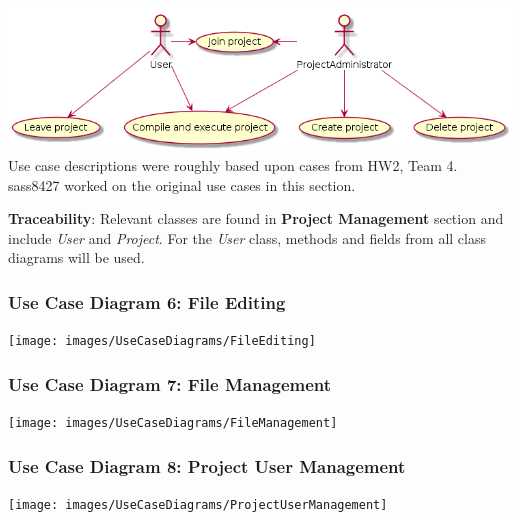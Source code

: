 \documentclass[twoside,letterpaper]{article}
\begin{document}
	\bigskip
		
		\includegraphics[width=6.0in]{images/UseCaseDiagrams/PMUCD} \vspace{5cm}
		\; \newline
		Use case descriptions were roughly based upon cases from HW2, Team 4. sass8427 worked on the original use cases in this section.\newline
	
	\noindent \textbf{Traceability}:
	Relevant classes are found in \textbf{Project Management} section and include \textit{User} and \textit{Project}. For the \textit{User} class, methods and fields from all class diagrams will be used.
	
	\newpage
	
	\subsubsection[Use Case Diagram 6: File Editing]{\rmfamily\bfseries\color{black}
		Use Case Diagram 6: File Editing}
	
	\texttt{[image: images/UseCaseDiagrams/FileEditing]}
	
	\newpage
	
	\subsubsection[Use Case Diagram 7: File Management]{\rmfamily\bfseries\color{black}
		Use Case Diagram 7: File Management}
	\hypertarget{RefHeading22059017292}{}
	
	\texttt{[image: images/UseCaseDiagrams/FileManagement]}
	
	\newpage
	
	\subsubsection[Use Case Diagram 8: Project User Management]{\rmfamily\bfseries\color{black}
		Use Case Diagram 8: Project User Management}
	
	\texttt{[image: images/UseCaseDiagrams/ProjectUserManagement]}
	
\end{document}
